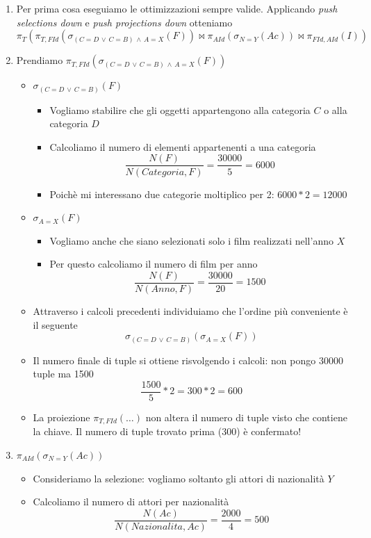 \begin{enumerate}
	\item Per prima cosa eseguiamo le ottimizzazioni sempre valide. Applicando \emph{push selections down} e \emph{push projections down} otteniamo
	\[\pi_T(\pi_{T,FId}(\sigma_{(C=D\,\lor\,C=B)\,\land\,A=X}(F)) \Join \pi_{AId}(\sigma_{N=Y}(Ac)) \Join \pi_{FId,AId}(I))\]
	\item Prendiamo $\pi_{T,FId}(\sigma_{(C=D\,\lor\,C=B)\,\land\,A=X}(F))$
	\begin{itemize}
		\item $\sigma_{(C=D\,\lor\,C=B)}(F)$
		\begin{itemize}
			\item Vogliamo stabilire che gli oggetti appartengono alla categoria $C$ o alla categoria $D$
			\item Calcoliamo il numero di elementi appartenenti a una categoria
			\[\frac{N(F)}{N(Categoria, F)} = \frac{30000}{5}=6000\]
			\item Poichè mi interessano due categorie moltiplico per 2: $6000*2=12000$
		\end{itemize}
		\item $\sigma_{A=X}(F)$
		\begin{itemize}
			\item Vogliamo anche che siano selezionati solo i film realizzati nell'anno $X$
			\item Per questo calcoliamo il numero di film per anno
			\[\frac{N(F)}{N(Anno, F)}=\frac{30000}{20}=1500\]
		\end{itemize}
		\item Attraverso i calcoli precedenti individuiamo che l'ordine più conveniente è il seguente
		\[\sigma_{(C=D\,\lor\,C=B)}(\sigma_{A=X}(F))\]
		\item Il numero finale di tuple si ottiene risvolgendo i calcoli: non pongo 30000 tuple ma 1500
		\[\frac{1500}{5}*2=300*2=\boxed{600}\]
		\item La proiezione $\pi_{T,FId}(\dots)$ non altera il numero di tuple visto che contiene la chiave. Il numero di tuple trovato prima (300) è confermato!
	\end{itemize}
	\item $\pi_{AId}(\sigma_{N=Y}(Ac))$
	\begin{itemize}
		\item Consideriamo la selezione: vogliamo soltanto gli attori di nazionalità $Y$
		\item Calcoliamo il numero di attori per nazionalità
		\[\frac{N(Ac)}{N(Nazionalita, Ac)}=\frac{2000}{4}=\boxed{500}\]

\end{itemize}
\end{enumerate}
